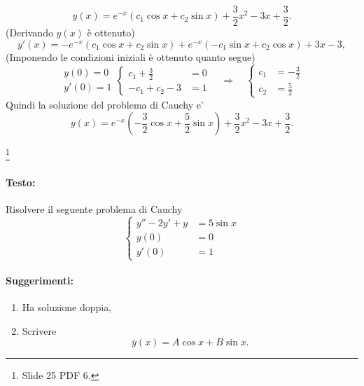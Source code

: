 \begin{example}
	\begin{equation*}
		y(x) = e^{-x} (c_1\cos x + c_2\sin x) + \frac{3}{2} x^2 - 3x + \frac{3}{2}.
	\end{equation*}
	(Derivando $y(x)$ è ottenuto)
	\begin{equation*}
		y'(x) = -e^{-x} (c_1\cos x + c_2\sin x) + e^{-x} (-c_1\sin x + c_2\cos x) + 3 x - 3,
	\end{equation*}
	(Imponendo le condizioni iniziali è ottenuto quanto segue)
	\begin{equation*}
		\begin{matrix}
			y(0) = 0\\
			y'(0) = 1
		\end{matrix}
		\begin{cases}
			c_1 + \frac{3}{2} &= 0\\
			-c_1 + c_2 - 3 &=1
		\end{cases}\quad\Rightarrow\quad
		\begin{cases}
			c_1 &= - \frac{3}{2}\\
			c_2 &= \frac{5}{2}
		\end{cases}
	\end{equation*}
	Quindi la soluzione del problema di Cauchy e'
	\begin{equation*}
		y(x) = e^{-x}\left(-\frac{3}{2}\cos x + \frac{5}{2} \sin x\right) + \frac{3}{2} x^2 - 3x + \frac{3}{2}. 
	\end{equation*}
\end{example}

\begin{exercise}\footnote{Slide 25 PDF 6.}
	\paragraph{Testo:} Risolvere il seguente problema di Cauchy
	\begin{equation*}
		\begin{cases}
			y'' - 2 y' + y &= 5\sin x\\
			y(0) &= 0\\
			y'(0) &= 1
		\end{cases}
	\end{equation*}
	\paragraph{Suggerimenti:}
	\begin{enumerate}
		\item Ha soluzione doppia,
		\item Scrivere
		\begin{equation*}
			\bar y(x) = A\cos x + B\sin x.
		\end{equation*}
	\end{enumerate}
\end{exercise}


